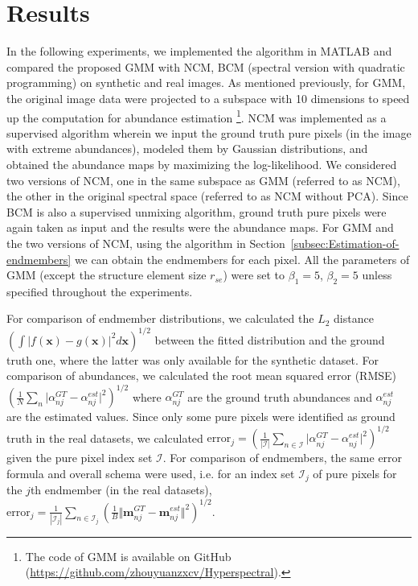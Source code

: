 \documentclass[twocolumn,english]{IEEEtran}
\theoremstyle{plain}
\begin{document}
\section{Results}

In the following experiments, we implemented the algorithm in MATLAB\textsuperscript{\textregistered}
and compared the proposed GMM with NCM, BCM (spectral version with
quadratic programming) \cite{du2014spatial} on synthetic and real
images. As mentioned previously, for GMM, the original image data
were projected to a subspace with 10 dimensions to speed up the computation
for abundance estimation \footnote{The code of GMM is available on GitHub (\url{https://github.com/zhouyuanzxcv/Hyperspectral}).}.
NCM was implemented as a supervised algorithm wherein we input the
ground truth pure pixels (in the image with extreme abundances), modeled
them by Gaussian distributions, and obtained the abundance maps by
maximizing the log-likelihood. We considered two versions of NCM,
one in the same subspace as GMM (referred to as NCM), the other in
the original spectral space (referred to as NCM without PCA). Since
BCM is also a supervised unmixing algorithm, ground truth pure pixels
were again taken as input and the results were the abundance maps.
For GMM and the two versions of NCM, using the algorithm in Section~\ref{subsec:Estimation-of-endmembers}
we can obtain the endmembers for each pixel. All the parameters of
GMM (except the structure element size $r_{se}$) were set to $\beta_{1}=5$,
$\beta_{2}=5$ unless specified throughout the experiments.

For comparison of endmember distributions, we calculated the $L_{2}$
distance $\left(\int\vert f\left(\mathbf{x}\right)-g\left(\mathbf{x}\right)\vert^{2}d\mathbf{x}\right)^{1/2}$
between the fitted distribution and the ground truth one, where the
latter was only available for the synthetic dataset. For comparison
of abundances, we calculated the root mean squared error (RMSE) $\left(\frac{1}{N}\sum_{n}\vert\alpha_{nj}^{GT}-\alpha_{nj}^{est}\vert^{2}\right)^{1/2}$
where $\alpha_{nj}^{GT}$ are the ground truth abundances and $\alpha_{nj}^{est}$
are the estimated values. Since only some pure pixels were identified
as ground truth in the real datasets, we calculated $\text{error}_{j}=\left(\frac{1}{\left|\mathcal{I}\right|}\sum_{n\in\mathcal{I}}\vert\alpha_{nj}^{GT}-\alpha_{nj}^{est}\vert^{2}\right)^{1/2}$
given the pure pixel index set $\mathcal{I}$. For comparison of endmembers,
the same error formula and overall schema were used, i.e. for an index
set $\mathcal{I}_{j}$ of pure pixels for the $j$th endmember (in
the real datasets), $\text{error}_{j}=\frac{1}{\left|\mathcal{I}_{j}\right|}\sum_{n\in\mathcal{I}_{j}}\left(\frac{1}{B}\Vert\mathbf{m}_{nj}^{GT}-\mathbf{m}_{nj}^{est}\Vert^{2}\right)^{1/2}$.
\end{document}
